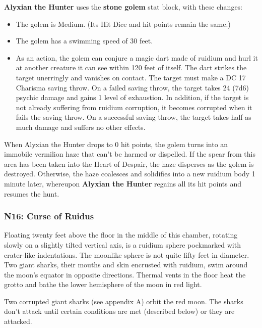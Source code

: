 \documentclass[10pt,a4paper,twoside,bg=print,twocolumn,openany,nodeprecatedcode]{dndbook}
\begin{document}
\textbf{Alyxian the Hunter} uses the \textbf{stone golem} stat block, with these changes:


\begin{itemize}
\item The golem is Medium. (Its Hit Dice and hit points remain the same.)
\item The golem has a swimming speed of 30 feet.
\item As an action, the golem can conjure a magic dart made of ruidium and hurl it at another creature it can see within 120 feet of itself. The dart strikes the target unerringly and vanishes on contact. The target must make a DC 17 Charisma saving throw. On a failed saving throw, the target takes 24 (7d6) psychic damage and gains 1 level of exhaustion. In addition, if the target is not already suffering from ruidium corruption, it becomes corrupted when it fails the saving throw. On a successful saving throw, the target takes half as much damage and suffers no other effects.
\end{itemize}

When Alyxian the Hunter drops to 0 hit points, the golem turns into an immobile vermilion haze that can't be harmed or dispelled. If the spear from this area has been taken into the Heart of Despair, the haze disperses as the golem is destroyed. Otherwise, the haze coalesces and solidifies into a new ruidium body 1 minute later, whereupon \textbf{Alyxian the Hunter} regains all its hit points and resumes the hunt.

\subsubsection{N16: Curse of Ruidus}
\begin{DndReadAloud}{}
Floating twenty feet above the floor in the middle of this chamber, rotating slowly on a slightly tilted vertical axis, is a ruidium sphere pockmarked with crater-like indentations. The moonlike sphere is not quite fifty feet in diameter. Two giant sharks, their mouths and skin encrusted with ruidium, swim around the moon's equator in opposite directions. Thermal vents in the floor heat the grotto and bathe the lower hemisphere of the moon in red light.

\end{DndReadAloud}

Two corrupted giant sharks (see appendix A) orbit the red moon. The sharks don't attack until certain conditions are met (described below) or they are attacked.
\end{document}
